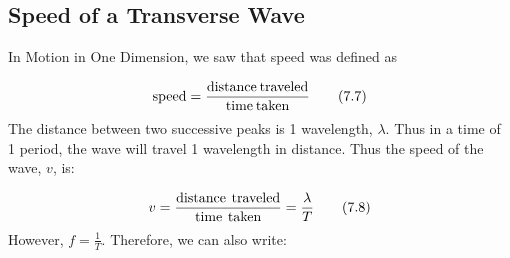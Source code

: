             \subsection{ Speed of a Transverse Wave}
            \nopagebreak
        \label{m38806*id319670}In Motion in One Dimension, we saw that speed was defined as\par 
        \label{m38806*id319676}\nopagebreak\noindent{}
    \begin{equation}
    \mathrm{speed}=\frac{\mathrm{distance}\phantom{\rule{2pt}{0ex}}\mathrm{traveled}}{\mathrm{time}\phantom{\rule{2pt}{0ex}}\mathrm{taken}}\tag{7.7}
      \end{equation}
        \label{m38806*id319706}The distance between two successive peaks is 1 wavelength, $\lambda $. Thus in a time of 1 period, the wave will travel 1 wavelength in distance. Thus the speed of the wave, $v$, is:\par 
        \label{m38806*id319732}\nopagebreak\noindent{}
    \begin{equation}
    v=\frac{\text{distance}\phantom{\rule{4.pt}{0ex}}\text{traveled}}{\text{time}\phantom{\rule{4.pt}{0ex}}\text{taken}}=\frac{\lambda }{T}\tag{7.8}
      \end{equation}
        \label{m38806*id319776}However, $f=\frac{1}{T}$. Therefore, we can also write:\par 
        \label{m38806*id319802}\nopagebreak\noindent{}
          
